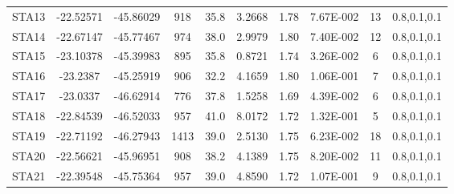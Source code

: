 \begin{table}[!ht]
\begin{center}
\begin{tabular}{| c | c | c | c | c | c | c | c | c | c |}
STA13 & -22.52571 & -45.86029 & 918 & 35.8 & 3.2668 & 1.78 & 7.67E-002 & 13 & 0.8,0.1,0.1\\
STA14 & -22.67147 & -45.77467 & 974 & 38.0 & 2.9979 & 1.80 & 7.40E-002 & 12 & 0.8,0.1,0.1\\
STA15 & -23.10378 & -45.39983 & 895 & 35.8 & 0.8721 & 1.74 & 3.26E-002 & 6 & 0.8,0.1,0.1\\
STA16 & -23.2387 & -45.25919 & 906 & 32.2 & 4.1659 & 1.80 & 1.06E-001 & 7 & 0.8,0.1,0.1\\
STA17 & -23.0337 & -46.62914 & 776 & 37.8 & 1.5258 & 1.69 & 4.39E-002 & 6 & 0.8,0.1,0.1\\
STA18 & -22.84539 & -46.52033 & 957 & 41.0 & 8.0172 & 1.72 & 1.32E-001 & 5 & 0.8,0.1,0.1\\
STA19 & -22.71192 & -46.27943 & 1413 & 39.0 & 2.5130 & 1.75 & 6.23E-002 & 18 & 0.8,0.1,0.1\\
STA20 & -22.56621 & -45.96951 & 908 & 38.2 & 4.1389 & 1.75 & 8.20E-002 & 11 & 0.8,0.1,0.1\\
STA21 & -22.39548 & -45.75364 & 957 & 39.0 & 4.8590 & 1.72 & 1.07E-001 & 9 & 0.8,0.1,0.1\\
\hline
\end{tabular}
\end{center}
\label{tabelaMoho}
\end{table}
